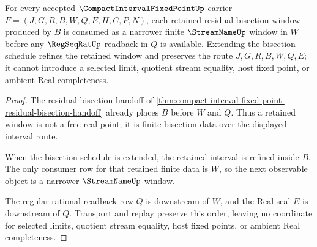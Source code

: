 \begin{theorem}
\label{thm:compact-interval-fixed-point-bisection-window-monotonicity}
For every accepted $\CompactIntervalFixedPointUp$ carrier $F=(J,G,R,B,W,Q,E,H,C,P,N)$, each retained residual-bisection window produced by $B$ is consumed as a narrower finite $\StreamNameUp$ window in $W$ before any $\RegSeqRatUp$ readback in $Q$ is available. Extending the bisection schedule refines the retained window and preserves the route $J,G,R,B,W,Q,E$; it cannot introduce a selected limit, quotient stream equality, host fixed point, or ambient Real completeness.
\end{theorem}
\begin{proof}
The residual-bisection handoff of \autoref{thm:compact-interval-fixed-point-residual-bisection-handoff} already places $B$ before $W$ and $Q$. Thus a retained window is not a free real point; it is finite bisection data over the displayed interval route.

When the bisection schedule is extended, the retained interval is refined inside $B$. The only consumer row for that retained finite data is $W$, so the next observable object is a narrower $\StreamNameUp$ window.

The regular rational readback row $Q$ is downstream of $W$, and the Real seal $E$ is downstream of $Q$. Transport and replay preserve this order, leaving no coordinate for selected limits, quotient stream equality, host fixed points, or ambient Real completeness.
\end{proof}

